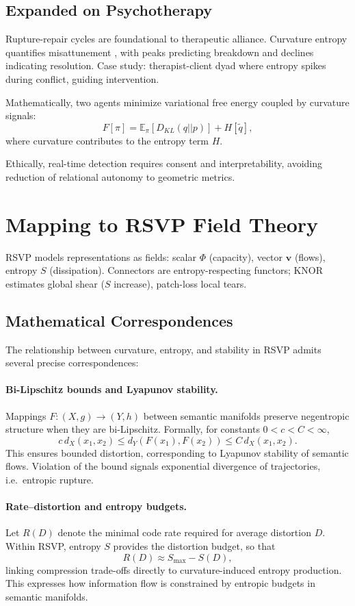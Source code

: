 \documentclass{article}
\theoremstyle{definition}
\begin{document}
\subsection{Expanded on Psychotherapy}

Rupture-repair cycles are foundational to therapeutic alliance. Curvature entropy quantifies misattunement \cite{bolis2017dialectical}, with peaks predicting breakdown and declines indicating resolution. Case study: therapist-client dyad where entropy spikes during conflict, guiding intervention.

Mathematically, two agents minimize variational free energy coupled by curvature signals:
\[
F[\pi] = \mathbb{E}_\pi [D_{KL}(q||p)] + H[\tilde{q}],
\]
where curvature contributes to the entropy term $H$.

Ethically, real-time detection requires consent and interpretability, avoiding reduction of relational autonomy to geometric metrics.

\section{Mapping to RSVP Field Theory}

RSVP models representations as fields: scalar $\Phi$ (capacity), vector $\mathbf{v}$ (flows), entropy $S$ (dissipation). Connectors are entropy-respecting functors; KNOR estimates global shear ($S$ increase), patch-loss local tears.

\subsection{Mathematical Correspondences}

The relationship between curvature, entropy, and stability in RSVP admits
several precise correspondences:

\paragraph{Bi-Lipschitz bounds and Lyapunov stability.}  
Mappings $F : (X,g) \to (Y,h)$ between semantic manifolds preserve
negentropic structure when they are bi-Lipschitz. Formally, for constants
$0<c<C<\infty$,
\[
c \, d_X(x_1,x_2) \leq d_Y(F(x_1),F(x_2)) \leq C \, d_X(x_1,x_2).
\]
This ensures bounded distortion, corresponding to Lyapunov stability of
semantic flows. Violation of the bound signals exponential divergence of
trajectories, i.e.\ entropic rupture.

\paragraph{Rate–distortion and entropy budgets.}  
Let $R(D)$ denote the minimal code rate required for average distortion $D$.
Within RSVP, entropy $S$ provides the distortion budget, so that
\[
R(D) \approx S_{\max} - S(D),
\]
linking compression trade-offs directly to curvature-induced entropy
production. This expresses how information flow is constrained by entropic
budgets in semantic manifolds.
\end{document}
